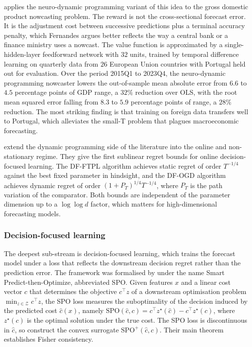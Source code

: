 \citet{Fernandes2024} applies the neuro-dynamic programming variant of this idea to
the gross domestic product nowcasting problem. The reward is not the cross-sectional
forecast error. It is the adjustment cost between successive predictions plus a
terminal accuracy penalty, which Fernandes argues better reflects the way a central
bank or a finance ministry uses a nowcast. The value function is approximated by a
single-hidden-layer feedforward network with $32$ units, trained by temporal
difference learning on quarterly data from $26$ European Union countries with
Portugal held out for evaluation. Over the period 2015Q1 to 2023Q4, the neuro-dynamic
programming nowcaster lowers the out-of-sample mean absolute error from $6.6$ to
$4.5$ percentage points of GDP range, a $32\%$ reduction over OLS, with the root
mean squared error falling from $8.3$ to $5.9$ percentage points of range, a $28\%$
reduction. The most striking finding is that training on foreign data transfers well
to Portugal, which alleviates the small-T problem that plagues macroeconomic
forecasting.

\citet{BenAmeur2025} extend the dynamic programming side of the literature into the
online and non-stationary regime. They give the first sublinear regret bounds for
online decision-focused learning. The DF-FTPL algorithm achieves static regret of
order $T^{-1/4}$ against the best fixed parameter in hindsight, and the DF-OGD
algorithm achieves dynamic regret of order $(1 + P_T)^{1/4} T^{-1/4}$, where $P_T$
is the path variation of the comparator. Both bounds are independent of the
parameter dimension up to a $\log \log d$ factor, which matters for high-dimensional
forecasting models.

\subsubsection{Decision-focused learning}
\label{sec:dfl}

The deepest sub-stream is decision-focused learning, which trains the forecast
model under a loss that reflects the downstream decision regret rather than the
prediction error. The framework was formalised by \citet{ElmachtoubGrigas2022} under
the name Smart Predict-then-Optimize, abbreviated SPO. Given features $x$ and a
linear cost vector $c$ that determines the objective $c^\top z$ of a downstream
optimisation problem $\min_{z \in \mathcal Z} c^\top z$, the SPO loss measures the
suboptimality of the decision induced by the predicted cost $\hat c(x)$, namely
$\mathrm{SPO}(\hat c, c) = c^\top z^\star(\hat c) - c^\top z^\star(c)$, where
$z^\star(c)$ is the optimal solution under the true cost. The SPO loss is
discontinuous in $\hat c$, so \citet{ElmachtoubGrigas2022} construct the convex
surrogate $\mathrm{SPO}^+(\hat c, c)$. Their main theorem establishes Fisher
consistency.

